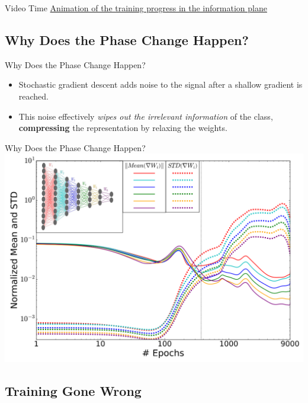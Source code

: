 \documentclass{beamer}
\begin{document}
\begin{frame}{Video Time}
    \centering
        \href{https://www.youtube.com/embed/q45lPv9rev0?enablejsapi=1}{Animation of the training progress in the information plane} \cite{Presentation}
\end{frame}


\subsection{Why Does the Phase Change Happen?}

\begin{frame}{Why Does the Phase Change Happen?}
    \begin{itemize}
        \item \alert{Stochastic gradient descent} adds noise to the signal after a shallow gradient is reached.
        \pause
        \item This noise effectively \textit{wipes out the irrelevant information} of the class, \textbf{compressing} the representation by relaxing the weights.
    \end{itemize}
\end{frame}

\begin{frame}{Why Does the Phase Change Happen?}
    \centering
        \includegraphics[scale=0.35]{Screenshot_11.png}
        \cite{Paper}
\end{frame}


\subsection{Training Gone Wrong}
\end{document}
